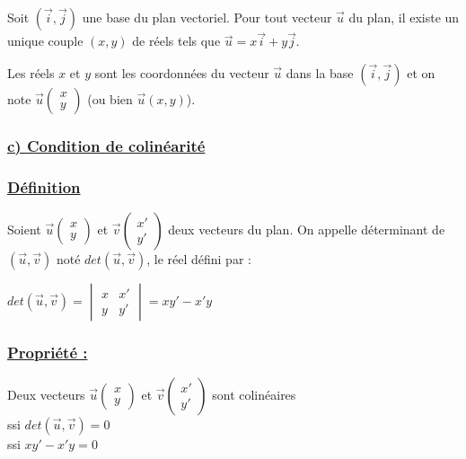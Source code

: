 \documentclass[12pt,a4paper]{article}
\begin{document}
Soit {\color{red}$(\vec{i}, \vec{j})$} une base du plan vectoriel. Pour tout vecteur {\color{red}$\vec{u}$} du plan, il existe un unique couple {\color{red}$(x, y)$} de réels tels que {\color{red}$\vec{u} = x\vec{i} + y\vec{j}$}.

Les réels {\color{red}$x$} et {\color{red}$y$} sont les coordonnées du vecteur {\color{red}$\vec{u}$} dans la base {\color{red}$(\vec{i}, \vec{j})$} et on note {\color{red}$\vec{u} \begin{pmatrix} x \\ y \end{pmatrix}$} (ou bien {\color{red}$\vec{u}(x, y)$}).

\subsubsection*{\centering \underline{\color{red} c) Condition de colinéarité}}
\subsubsection*{\centering \underline{\color{red} Définition}}

\vspace{0.3cm}

Soient {\color{red}$\vec{u} \begin{pmatrix} x \\ y \end{pmatrix}$} et {\color{red}$\vec{v} \begin{pmatrix} x' \\ y' \end{pmatrix}$} deux vecteurs du plan. On appelle déterminant de {\color{red}$(\vec{u}, \vec{v})$} noté {\color{red}$det(\vec{u}, \vec{v})$}, le réel défini par :

\vspace{0.2cm}

{\color{red} $det(\vec{u}, \vec{v}) = \begin{vmatrix} x & x' \\ y & y' \end{vmatrix} = xy' - x'y$}

\subsubsection*{\centering \underline{\color{red} Propriété :}}

Deux vecteurs {\color{red}$\vec{u} \begin{pmatrix} x \\ y \end{pmatrix}$} et {\color{red}$\vec{v} \begin{pmatrix} x' \\ y' \end{pmatrix}$} sont colinéaires \\
ssi {\color{red}$det(\vec{u}, \vec{v}) = 0$} \\
ssi {\color{red}$xy' - x'y = 0$}
\end{document}
